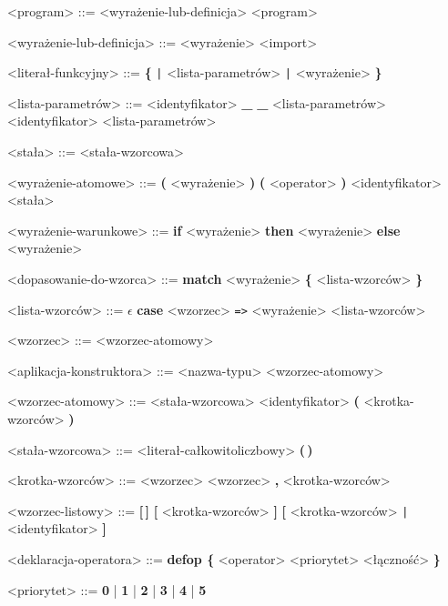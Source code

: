 \documentclass[12pt]{article}
\begin{document}
\begin{grammar}

<program> ::=
    <wyrażenie-lub-definicja>
     <program>

<wyrażenie-lub-definicja> ::=
    <wyrażenie>
    \alt <import>

<literał-funkcyjny> ::=
    \textbf{\{} \texttt{|} <lista-parametrów> \texttt{|} <wyrażenie> \textbf{\}}

<lista-parametrów> ::=
    <identyfikator>
    \alt \textbf{_}
    \alt \textbf{_} <lista-parametrów>
    \alt <identyfikator> <lista-parametrów>

<stała> ::=
    <stała-wzorcowa>

<wyrażenie-atomowe> ::=
    \textbf{(} <wyrażenie> \textbf{)}
    \textbf{(} <operator> \textbf{)}
    \alt <identyfikator>
    \alt <stała>

<wyrażenie-warunkowe> ::=
    \textbf{if} <wyrażenie>
    \textbf{then} <wyrażenie>
    \textbf{else} <wyrażenie>

<dopasowanie-do-wzorca> ::=
    \textbf{match} <wyrażenie> \textbf{\{}
    <lista-wzorców> \textbf{\}}

<lista-wzorców> ::= $\epsilon$
    \alt \textbf{case} <wzorzec> \texttt{=>} <wyrażenie> <lista-wzorców>

<wzorzec> ::=
    <wzorzec-atomowy>

<aplikacja-konstruktora> ::=
    <nazwa-typu> <wzorzec-atomowy>

<wzorzec-atomowy> ::=
    <stała-wzorcowa>
    \alt <identyfikator>
    \alt \textbf{(} <krotka-wzorców> \textbf{)}

<stała-wzorcowa> ::=
    <literał-całkowitoliczbowy>
    \alt \textbf{(\,)}

<krotka-wzorców> ::=
    <wzorzec>
    \alt <wzorzec> \textbf{,} <krotka-wzorców>

<wzorzec-listowy> ::=
    \textbf{[\,]}
    \alt \textbf{[} <krotka-wzorców> \textbf{]}
    \alt \textbf{[} <krotka-wzorców> \texttt{|} <identyfikator> \textbf{]}

<deklaracja-operatora> ::=
    \textbf{defop \{} <operator> <priorytet> <łączność> \textbf{\}}

<priorytet> ::=
    \textbf{0} | \textbf{1} | \textbf{2} | \textbf{3} | \textbf{4} | \textbf{5}


\end{grammar}
\end{document}
